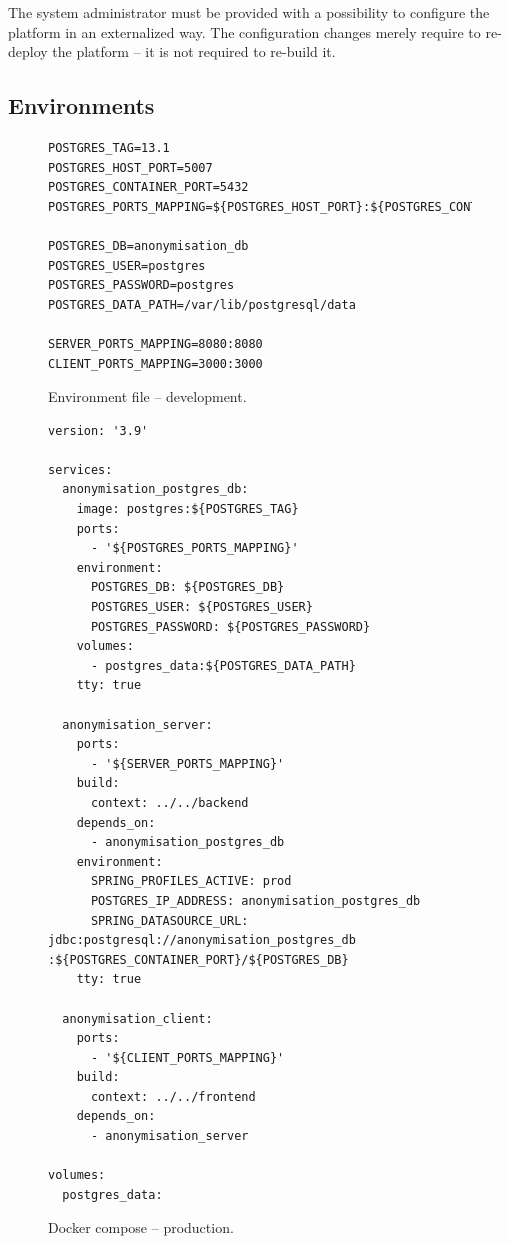 \documentclass[a4paper,twoside,12pt]{book}
\begin{document}
The system administrator must be provided with a possibility to configure the platform in an externalized way. The configuration changes merely require to re-deploy the platform -- it is not required to re-build it.

\subsection{Environments}



\begin{figure}%
\begin{verbatim}
POSTGRES_TAG=13.1
POSTGRES_HOST_PORT=5007
POSTGRES_CONTAINER_PORT=5432
POSTGRES_PORTS_MAPPING=${POSTGRES_HOST_PORT}:${POSTGRES_CONTAINER_PORT}

POSTGRES_DB=anonymisation_db
POSTGRES_USER=postgres
POSTGRES_PASSWORD=postgres
POSTGRES_DATA_PATH=/var/lib/postgresql/data

SERVER_PORTS_MAPPING=8080:8080
CLIENT_PORTS_MAPPING=3000:3000
\end{verbatim}
\caption{Environment file – development.}
\label{fig:code:environment_production}
\end{figure}


\begin{figure}%
\begin{verbatim}
version: '3.9'

services:
  anonymisation_postgres_db:
    image: postgres:${POSTGRES_TAG}
    ports:
      - '${POSTGRES_PORTS_MAPPING}'
    environment:
      POSTGRES_DB: ${POSTGRES_DB}
      POSTGRES_USER: ${POSTGRES_USER}
      POSTGRES_PASSWORD: ${POSTGRES_PASSWORD}
    volumes:
      - postgres_data:${POSTGRES_DATA_PATH}
    tty: true

  anonymisation_server:
    ports:
      - '${SERVER_PORTS_MAPPING}'
    build:
      context: ../../backend
    depends_on:
      - anonymisation_postgres_db
    environment:
      SPRING_PROFILES_ACTIVE: prod
      POSTGRES_IP_ADDRESS: anonymisation_postgres_db
      SPRING_DATASOURCE_URL: jdbc:postgresql://anonymisation_postgres_db :${POSTGRES_CONTAINER_PORT}/${POSTGRES_DB}
    tty: true

  anonymisation_client:
    ports:
      - '${CLIENT_PORTS_MAPPING}'
    build:
      context: ../../frontend
    depends_on:
      - anonymisation_server

volumes:
  postgres_data:
\end{verbatim}
\caption{Docker compose – production.}
\label{fig:code:docker_compose_production}
\end{figure}
\end{document}
